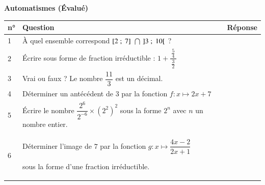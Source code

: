 \documentclass[oneside,12pt]{exam}          %
\begin{document}

\footer{}{\footnotesize \etablissement}{}

\hrulefill\raisebox{-1.9pt}{\quad\decofourleft~\decosix~\decofourright \quad}\hrulefill
\begin{center}
	\textbf{\large Automatismes  (Évalué)}
\end{center}



\renewcommand{\arraystretch}{3}

\begin{center}
	\begin{tabular}{| P{2cm} | P{10cm} | P{5cm} |} \hline
		\textbf{n°} & \textbf{Question} & \textbf{Réponse} \\  & À quel ensemble correspond $[2 ~;~ 7] \,\,\bigcap\,\, ]3 ~;~ 10[$ ? &  \\  & Écrire sous forme de fraction irréductible : $1 + \dfrac{\,\frac{5}{4}\,}{\frac{3}{2}}$ &  \\  & Vrai ou faux ? Le nombre $\dfrac{11}{3}$ est un décimal. &  \\  & Déterminer un antécédent de $3$ par la fonction $f: x \mapsto 2x + 7$ &  \\  & Écrire le nombre $\dfrac{2^6}{2^{-6}} \times {(2^2)}^2$  sous la forme $2^n$ avec $n$ un nombre entier.&  \\  & Déterminer l'image de $7$ par la fonction $g : x\mapsto \dfrac{4x - 2}{2x + 1}$
		
		sous la forme d'une fraction irréductible. &  \\ \hline 
	\end{tabular}
\end{center}
\end{document}
